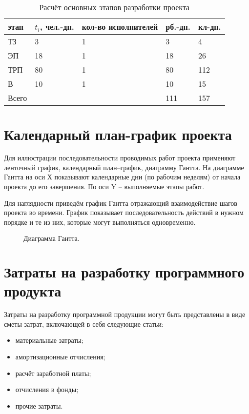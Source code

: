 \begin{table}[H]
    \caption{\label{tab:development-stages-calc}Расчёт основных этапов разработки проекта}
    \begin{tabular}[H]{|l|l|l|l|l|}
        \hline
        этап & $t_i$, чел.-дн. & кол-во исполнителей & рб.-дн. & кл-дн.\\
        \hline
        ТЗ & 3 & 1 & 3 & 4\\
        \hline
        ЭП & 18 & 1 & 18 & 26\\
        \hline
        ТРП & 80 & 1 & 80 & 112\\
        \hline
        В & 10 & 1 & 10 & 15\\
        \hline
        Всего &  &  &  111 & 157\\
        \hline
    \end{tabular}
\end{table}

\section{Календарный план-график проекта}
Для иллюстрации последовательности проводимых работ проекта применяют ленточный график, календарный план–график, диаграмму Гантта. На диаграмме Гантта на оси Х показывают календарные дни (по рабочим неделям) от начала проекта до его завершения. По оси Y – выполняемые этапы работ.

Для наглядности приведём график Гантта отражающий взаимодействие шагов проекта во времени. График показывает последовательность действий в нужном порядке и те из них, которые могут выполняться одновременно.
\begin{figure}[H]
    \caption{Диаграмма Гантта.}
    \label{img:gantt}
\end{figure}

\section{Затраты на разработку программного продукта}
Затраты на разработку программной продукции могут быть представлены в виде сметы затрат, включающей в себя следующие статьи:
\begin{itemize}
	\item материальные затраты;
	\item амортизационные отчисления;
	\item расчёт заработной платы;
	\item отчисления в фонды;
	\item прочие затраты.
\end{itemize}

